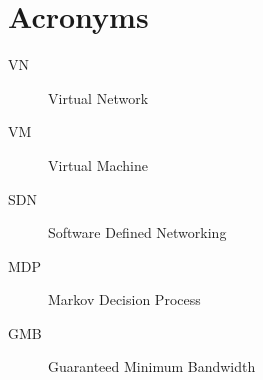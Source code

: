 \chapter*{Acronyms}

\begin{description}
\item[VN] Virtual Network
\item[VM] Virtual Machine
\item[SDN] Software Defined Networking
\item[MDP] Markov Decision Process
\item[GMB] Guaranteed Minimum Bandwidth
\end{description}
